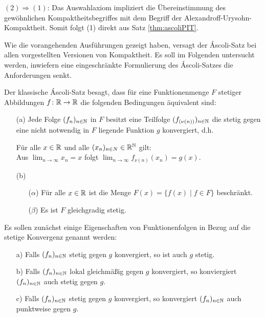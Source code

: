   $(2)\Rightarrow(1)$: Das Auswahlaxiom impliziert die Übereinstimmung des gewöhnlichen Kompaktheitsbegriffes mit dem Begriff der Alexandroff-Urysohn-Kompaktheit. Somit folgt (1) direkt aus Satz \ref{thm:ascoliPIT}.

Wie die vorangehenden Ausführungen gezeigt haben, versagt der Áscoli-Satz bei allen vorgestellten Versionen von Kompaktheit. Es soll im Folgenden untersucht werden, inwiefern eine eingeschränkte Formulierung des Áscoli-Satzes die Anforderungen senkt.

\begin{defn}
  Der klassische Áscoli-Satz besagt, dass für eine Funktionenmenge $F$ stetiger Abbildungen $f \colon \mathbb{R} \to \mathbb{R}$ die folgenden Bedingungen äquivalent sind:
  \begin{itemize}
    \item[(a)] Jede Folge $(f_n)_{n \in \mathbb{N}}$ in $F$ besitzt eine Teilfolge $(f_{(\nu(n))})_{n \in \mathbb{N}}$ die stetig gegen eine nicht notwendig in $F$ liegende Funktion $g$ konvergiert, d.h.
      \begin{addmargin}[2em]{2em}%
        Für alle $x \in \mathbb{R}$ und alle $(x_n)_{n \in N} \in \mathbb{R}^{\mathbb{N}}$ gilt: \\
        Aus $\lim_{n \to \infty} x_n = x$ folgt $\lim_{n \to \infty} f_{\nu(n)}(x_n) = g(x)$.
      \end{addmargin}
    \item[(b)]
      \begin{itemize}
        \item[($\alpha$)] Für alle $x \in \mathbb{R}$ ist die Menge $F(x) = \{ f(x) \mid f \in F\}$ beschränkt.
        \item[($\beta$)] Es ist $F$ gleichgradig stetig.
      \end{itemize}
  \end{itemize}
\end{defn}

Es sollen zunächst einige Eigenschaften von Funktionenfolgen in Bezug auf die stetige Konvergenz genannt werden:

\begin{prop}
  \begin{itemize}
    \item[a)] Falls $(f_n)_{n \in \mathbb{N}}$ stetig gegen $g$ konvergiert, so ist auch $g$ stetig.
    \item[b)] Falls $(f_n)_{n \in \mathbb{N}}$ lokal gleichmäßig gegen $g$ konvergiert, so konviergiert $(f_n)_{n \in \mathbb{N}}$ auch stetig gegen $g$.
    \item[c)] Falls $(f_n)_{n \in \mathbb{N}}$ stetig gegen $g$ konvergiert, so konvergiert $(f_n)_{n \in \mathbb{N}}$ auch punktweise gegen $g$.
  \end{itemize}
\end{prop}

